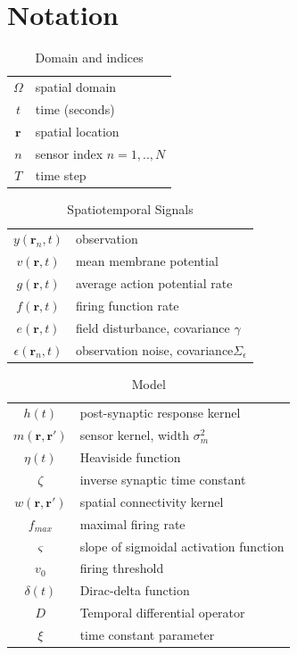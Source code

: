\documentclass[10pt,a4paper]{article}
\begin{document}
\section{Notation}

\begin{table}[h!]\footnotesize
    \centering
    \begin{tabular}{cl}
        $\Omega$ & spatial domain \\
	    $t$ & time (seconds) \\
    	$\mathbf{r}$ & spatial location \\
	    $n$ & sensor index $n=1,..,N$ \\
    	$T$ & time step
    \end{tabular}
    \caption{Domain and indices}
\end{table}

\begin{table}[h!]\footnotesize
    \centering
    \begin{tabular}{cl}
        $y(\mathbf{r}_n,t)$ & observation \\
	    $v(\mathbf{r},t)$ & mean membrane potential \\
    	$g(\mathbf{r},t)$ & average action potential rate \\
    	$f(\mathbf{r},t)$ & firing function rate \\
    	$e(\mathbf{r},t)$ & field disturbance, covariance $\gamma$\\
    	$\epsilon(\mathbf{r}_n,t)$ & observation noise, covariance$\Sigma_\epsilon$ \\
    \end{tabular}
    \caption{Spatiotemporal Signals}
\end{table}

\begin{table}[h!]\footnotesize
    \centering
    \begin{tabular}{cl}
        	$h(t)$ & post-synaptic response kernel \\
	$m(\mathbf{r},\mathbf{r}')$ & sensor kernel, width $\sigma_m^2$ \\
	$\eta(t)$ & Heaviside function \\
	$\zeta$ & inverse synaptic time constant \\
	$w(\mathbf{r},\mathbf{r}')$ & spatial connectivity kernel \\
	$f_{max}$ & maximal firing rate \\
	$\varsigma$ & slope of sigmoidal activation function \\
	$v_0$ & firing threshold \\
	$\delta(t)$ & Dirac-delta function \\
	$D$ & Temporal differential operator \\
	$\xi$ & time constant parameter
    \end{tabular}
    \caption{Model}
\end{table}
\end{document}
